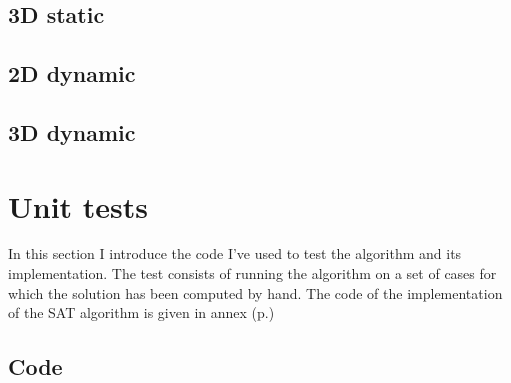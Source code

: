 \documentclass[12pt, a4paper]{article}
\begin{document}
\begin{scriptsize}
\begin{ttfamily}

\end{ttfamily}
\end{scriptsize}

\subsection{3D static}

\begin{scriptsize}
\begin{ttfamily}

\end{ttfamily}
\end{scriptsize}

\subsection{2D dynamic}

\begin{scriptsize}
\begin{ttfamily}

\end{ttfamily}
\end{scriptsize}

\subsection{3D dynamic}

\begin{scriptsize}
\begin{ttfamily}

\end{ttfamily}
\end{scriptsize}

\section{Unit tests}

In this section I introduce the code I've used to test the algorithm and its implementation. The test consists of running the algorithm on a set of cases for which the solution has been computed by hand. The code of the implementation of the SAT algorithm is given in annex (p.\pageref{sat_implementation})\\

\subsection{Code}
\end{document}
